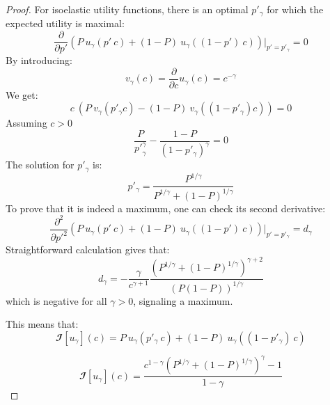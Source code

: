 \documentclass{article}
\theoremstyle{definition}
\begin{document}
\begin{proof}
    For isoelastic utility functions, there is an optimal $p'_\gamma$ for which the expected utility is maximal:
    \begin{equation}
        \frac{\partial}{\partial p'} \left ( P \ u_\gamma(p' \ c) + (1-P) \ u_\gamma((1-p') \ c) \right ) \Bigr|_{p'=p'_\gamma} = 0
    \end{equation}
    By introducing:
        \begin{equation}
        v_\gamma(c) = \frac{\partial}{\partial c} u_\gamma(c) = c^{-\gamma}
    \end{equation}
    We get:
    \begin{equation}
        c \ \left ( P \ v_\gamma(p'_\gamma c) - (1-P) \ v_\gamma((1-p'_\gamma) c) \right ) = 0
    \end{equation}
    Assuming $c>0$
    \begin{equation}
        \frac{P}{{p'}_\gamma^{\gamma}} - \frac{1-P}{(1-p'_\gamma)^{\gamma}} = 0
    \end{equation}
    The solution for $p'_\gamma$ is:
    \begin{equation}
        p'_\gamma = \frac{P^{1/\gamma}}{P^{1/\gamma}+(1-P)^{1/\gamma}}
    \end{equation}
    To prove that it is indeed a maximum, one can check its second derivative:
    \begin{equation}
        \frac{\partial^2}{\partial {p'}^2} \left ( P \ u_\gamma(p' \ c) + (1-P) \ u_\gamma((1-p') \ c) \right ) \Bigr|_{p'=p'_\gamma} = d_\gamma
    \end{equation}
    Straightforward calculation gives that:
    \begin{equation}
        d_\gamma = - \frac{\gamma}{c^{\gamma + 1}} \frac{\left ( P^{1/\gamma} + (1-P)^{1/\gamma} \right )^{\gamma + 2}}{\left ( P (1-P) \right )^{1/\gamma}}
    \end{equation}
    which is negative for all $\gamma > 0$, signaling a maximum.

    This means that:
    \begin{equation}
    \mathbfcal{I}[u_\gamma](c) = P \ u_\gamma(p'_\gamma \ c) + (1-P) \ u_\gamma((1-p'_\gamma) \ c)
    \end{equation}

    \begin{equation}
    \mathbfcal{I}[u_\gamma](c) = \frac{c^{1-\gamma} \left ( P^{1/\gamma} + (1-P)^{1/\gamma} \right )^\gamma -1}{1-\gamma}
    \end{equation}


\end{proof}
\end{document}
